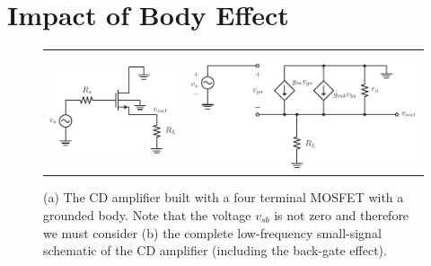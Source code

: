 \newpage
\section{Impact of Body Effect}
\begin{figure}[tb]
\centering
\begin{tabular}{cc}
\includegraphics[scale=1]{cd_amp_ac_body} &
\includegraphics[scale=.8]{cd_amp_ss_av_body 2}
\end{tabular}
\caption{(a) The CD amplifier built with a four terminal MOSFET with a grounded body.  Note that the voltage $v_{sb}$ is not zero and therefore we must consider (b) the complete low-frequency small-signal schematic of the CD amplifier (including the back-gate effect).}
\label{fig:cd_amp_ac_body}
\end{figure}

